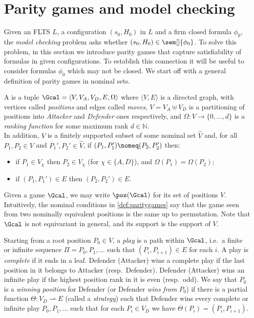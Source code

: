 \section{Parity games and model checking}\label{sec:modelchecking}
\newcommand\ndb{qweqwe}
\renewcommand\fgame{\Gcal}
\newcommand\wellbound[1]{\triangleleft_{#1}}

Given an FLTS $L$, a configuration $(s_0,H_0)$ in $L$ and a firm closed formula $\phi_0$,
the \emph{model checking} problem asks whether $(s_0,H_0)\in\sem[]{\phi_0}$. To solve this problem, in this section we introduce parity games that capture satisfiability of formulas in given configurations. To establish this connection it will be useful to consider formulas $\phi_0$ which may not be closed.
We start off with a general definition of parity games in nominal sets.

\begin{definition}\label{def:paritygames}
  A  is a tuple $\Gcal=\langle V,V_A,V_D,E,\Omega\rangle$ where $\langle V,E\rangle$ is a directed graph, with vertices called \emph{positions} and edges called \emph{moves}, $V=V_A\uplus V_D$ is a partitioning of positions into \emph{Attacker} and \emph{Defender} ones respectively, and $\Omega:V\to\{0,\dots,d\}$ is a \emph{ranking function} for some maximum rank $d\in\mathbb{N}$.\\
  In addition, $V$ is a finitely supported subset of some nominal set $\hat V$ and, for all $P_1,P_2\in V$ and $P_1',P_2'\in\hat V$, if $(P_1,P_1')\nomeq (P_2,P_2')$ then:
  \begin{itemize}
  \item if $P_1\in V_\chi$ then $P_2\in V_\chi$ (for $\chi\in\{A,D\}$), and $\Omega(P_1)=\Omega(P_2)$;
  \item if $(P_1,P_1')\in E$ then $(P_2,P_2')\in E$.
  \end{itemize}
\end{definition}

Given a game $\Gcal$, we may write $\pos(\Gcal)$ for its set of positions $V$.
Intuitively, the nominal conditions in \cref{def:paritygames} say that the game seen from two nominally equivalent positions is the same up to permutation.
Note that $\Gcal$ is not equivariant in general, and its support is the support of $V$.

Starting from a root position $P_0\in V$, a \emph{play} is a path within $\Gcal$, i.e.\ a finite or infinite sequence $\Pi=P_0,P_1,\dots$ such that $(P_i,P_{i+1})\in E$ for each $i$. A play is \emph{complete} if it ends in a leaf. Defender (Attacker) wins a complete play if the last position in it belongs to Attacker (resp.~Defender). Defender (Attacker) wins an infinite play if the highest position rank in it is even (resp.~odd). We say that  $P_0$ is a \emph{winning position} for Defender (or Defender \emph{wins from} $P_0$) if there is a partial function $\Theta: V_D\rightharpoonup E$ (called a \emph{strategy}) such that Defender wins  every complete or infinite play $P_0,P_1,\dots$ such that for each $P_i\in V_D$ we have $\Theta(P_i)=(P_i,P_{i+1})$.

